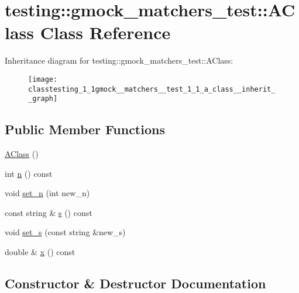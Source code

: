 \hypertarget{classtesting_1_1gmock__matchers__test_1_1_a_class}{}\section{testing\+:\+:gmock\+\_\+matchers\+\_\+test\+:\+:A\+Class Class Reference}
\label{classtesting_1_1gmock__matchers__test_1_1_a_class}


Inheritance diagram for testing\+:\+:gmock\+\_\+matchers\+\_\+test\+:\+:A\+Class\+:
\nopagebreak
\begin{figure}[H]
\begin{center}
\leavevmode
\texttt{[image: classtesting\_1\_1gmock\_\_matchers\_\_test\_1\_1\_a\_class\_\_inherit\_\_graph]}
\end{center}
\end{figure}
\subsection*{Public Member Functions}
\begin{DoxyCompactItemize}
\item 
\hyperlink{classtesting_1_1gmock__matchers__test_1_1_a_class_ac43d717a80bb6fad8c77dc36f963ca88}{A\+Class} ()
\item 
int \hyperlink{classtesting_1_1gmock__matchers__test_1_1_a_class_a6fb09c7c4d2314a2f9af9d07b31d02c1}{n} () const 
\item 
void \hyperlink{classtesting_1_1gmock__matchers__test_1_1_a_class_a3181466cec6faa5ab3c6bc5c4dbf67b2}{set\+\_\+n} (int new\+\_\+n)
\item 
const string \& \hyperlink{classtesting_1_1gmock__matchers__test_1_1_a_class_a4cbf37b13f0f9a2497ef8effc938d0f8}{s} () const 
\item 
void \hyperlink{classtesting_1_1gmock__matchers__test_1_1_a_class_a131c5d2da4b5984f5af3fd84898eaf09}{set\+\_\+s} (const string \&new\+\_\+s)
\item 
double \& \hyperlink{classtesting_1_1gmock__matchers__test_1_1_a_class_a4480f51cb8e304fc5551712a6507a1c9}{x} () const 
\end{DoxyCompactItemize}


\subsection{Constructor \& Destructor Documentation}
